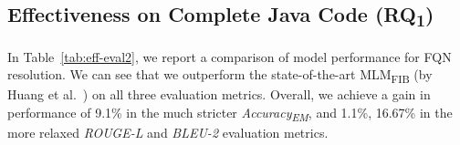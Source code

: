 \subsection{Effectiveness on Complete Java Code (RQ\textsubscript{1})}
\label{sec:rq1}

In Table~\ref{tab:eff-eval2}, we report a comparison of model performance for FQN resolution. We can see that we outperform the state-of-the-art MLM\textsubscript{FIB} (by Huang et al.~\cite{prompt-ase22}) on all three evaluation metrics. Overall, we achieve a gain in performance of 9.1\% in the much stricter \textit{Accuracy\textsubscript{EM}}, and 1.1\%, 16.67\% in the more relaxed \textit{ROUGE-L} and \textit{BLEU-2} evaluation metrics.



